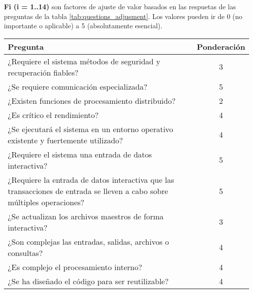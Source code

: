 	\textbf{Fi (i = 1..14)} son factores de ajuste de valor basados en las respuetas de las preguntas de la tabla \ref{tab:questions_adjusment}. Los valores pueden ir de 0 (no importante o aplicable) a 5 (absolutamente esencial).

	\begin{table}
		\begin{tabular}{|p{9cm}|c|}
		\hline
		Pregunta                                                                                                                 & Ponderación \\ \hline
		¿Requiere el sistema métodos de seguridad y recuperación fiables?                                                       & 3           \\ \hline
		¿Se requiere comunicación especializada?                                                                              & 5           \\ \hline
		¿Existen funciones de procesamiento distribuido?                                                                         & 2           \\ \hline
		¿Es crítico el rendimiento?                                                                                              & 4           \\ \hline
		¿Se ejecutará el sistema en un entorno operativo existente y fuertemente utilizado?                                      & 4           \\ \hline
		¿Requiere el sistema una entrada de datos interactiva?                                                                    & 5           \\ \hline
		¿Requiere la entrada de datos interactiva que las transacciones de entrada se lleven a cabo sobre múltiples operaciones? & 5           \\ \hline
		¿Se actualizan los archivos maestros de forma interactiva?                                                               & 3           \\ \hline
		¿Son complejas las entradas, salidas, archivos o consultas?                                                               & 4           \\ \hline
		¿Es complejo el procesamiento interno?                                                                                   & 4           \\ \hline
		¿Se ha diseñado el código para ser reutilizable?                                                                         & 4           \\ \hline

\end{tabular}
\end{table}
